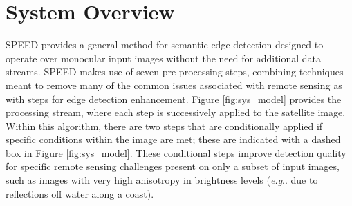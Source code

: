 \documentclass[conference]{IEEEtran}
\makeatletter
\DeclareRobustCommand\onedot{\futurelet\@let@token\@onedot}
\def\@onedot{\ifx\@let@token.\else.\null\fi\xspace}
\def\eg{\emph{e.g}\onedot}
\makeatother
\begin{document}

\section{System Overview}
\label{sec:SystemOverview}

SPEED provides a general method for semantic edge detection designed to operate over monocular input images without the need for additional data streams. SPEED makes use of seven pre-processing steps, combining techniques meant to remove many of the common issues associated with remote sensing as with steps for edge detection enhancement. Figure \ref{fig:sys_model} provides the processing stream, where each step is successively applied to the satellite image. Within this algorithm, there are two steps that are conditionally applied if specific conditions within the image are met; these are indicated with a dashed box in Figure \ref{fig:sys_model}. These conditional steps improve detection quality for specific remote sensing challenges present on only a subset of input images, such as images with very high anisotropy in brightness levels (\eg due to reflections off water along a coast). 
\end{document}
